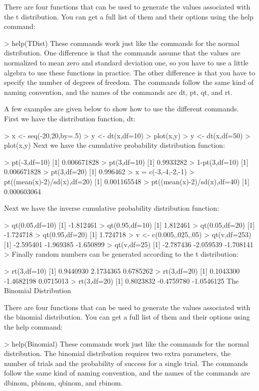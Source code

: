 \documentclass[a4paper,12pt]{article}
\begin{document}
There are four functions that can be used to generate the values associated with the t distribution. You can get a full list of them and their options using the help command:

> help(TDist)
These commands work just like the commands for the normal distribution. One difference is that the commands assume that the values are normalized to mean zero and standard deviation one, so you have to use a little algebra to use these functions in practice. The other difference is that you have to specify the number of degrees of freedom. The commands follow the same kind of naming convention, and the names of the commands are dt, pt, qt, and rt.

A few examples are given below to show how to use the different commands. First we have the distribution function, dt:

> x <- seq(-20,20,by=.5)
> y <- dt(x,df=10)
> plot(x,y)
> y <- dt(x,df=50)
> plot(x,y)
Next we have the cumulative probability distribution function:

> pt(-3,df=10)
[1] 0.006671828
> pt(3,df=10)
[1] 0.9933282
> 1-pt(3,df=10)
[1] 0.006671828
> pt(3,df=20)
[1] 0.996462
> x = c(-3,-4,-2,-1)
> pt((mean(x)-2)/sd(x),df=20)
[1] 0.001165548
> pt((mean(x)-2)/sd(x),df=40)
[1] 0.000603064

Next we have the inverse cumulative probability distribution function:

> qt(0.05,df=10)
[1] -1.812461
> qt(0.95,df=10)
[1] 1.812461
> qt(0.05,df=20)
[1] -1.724718
> qt(0.95,df=20)
[1] 1.724718
> v <- c(0.005,.025,.05)
> qt(v,df=253)
[1] -2.595401 -1.969385 -1.650899
> qt(v,df=25)
[1] -2.787436 -2.059539 -1.708141
> 
Finally random numbers can be generated according to the t distribution:

> rt(3,df=10)
[1] 0.9440930 2.1734365 0.6785262
> rt(3,df=20)
[1]  0.1043300 -1.4682198  0.0715013
> rt(3,df=20)
[1]  0.8023832 -0.4759780 -1.0546125
The Binomial Distribution

There are four functions that can be used to generate the values associated with the binomial distribution. You can get a full list of them and their options using the help command:

> help(Binomial)
These commands work just like the commands for the normal distribution. The binomial distribution requires two extra parameters, the number of trials and the probability of success for a single trial. The commands follow the same kind of naming convention, and the names of the commands are dbinom, pbinom, qbinom, and rbinom.
\end{document}
